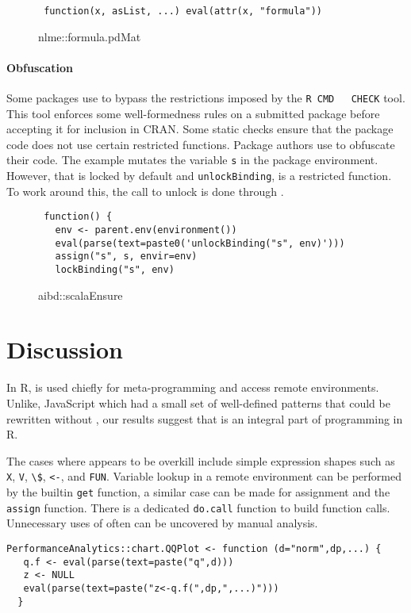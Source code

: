 \documentclass[screen,acmsmall]{acmart}%
\renewcommand{\k}[1]{\lstinline |#1|\xspace}
\begin{document}
\begin{figure}[h]
\begin{lstlisting}
 function(x, asList, ...) eval(attr(x, "formula"))
\end{lstlisting}
  \caption{nlme::formula.pdMat}
\end{figure}

\paragraph{Obfuscation}
Some packages use \eval to bypass the restrictions imposed by the \k{R CMD
  CHECK} tool. This tool enforces some well-formedness rules on a submitted
package before accepting it for inclusion in CRAN. Some static checks ensure
that the package code does not use certain restricted functions. Package authors
use \eval to obfuscate their code. The example mutates the variable \k{s} in
the package environment. However, that is locked by default and
\k{unlockBinding}, is a restricted function. To work around this, the call to
unlock is done through \eval.

\begin{figure}[h]
\begin{lstlisting}
 function() {
   env <- parent.env(environment())
   eval(parse(text=paste0('unlockBinding("s", env)')))
   assign("s", s, envir=env)
   lockBinding("s", env)
\end{lstlisting}
  \caption{aibd::scalaEnsure}
\end{figure}

\section{Discussion}


In R, \eval is used chiefly for meta-programming and access remote environments.
Unlike, JavaScript which had a small set of well-defined patterns that could be
rewritten without \eval, our results suggest that \eval is an integral part of
programming in R.

The cases where \eval appears to be overkill include simple expression shapes
such as \k{X}, \k{V}, \k{\$}, \k{<-}, and \k{FUN}. Variable lookup in a remote
environment can be performed by the builtin \k{get} function, a similar case
can be made for assignment and the \k{assign} function. There is a dedicated
\k{do.call} function to build function calls. Unnecessary uses of \eval
often can be uncovered by manual analysis.

\begin{lstlisting}
PerformanceAnalytics::chart.QQPlot <- function (d="norm",dp,...) {
   q.f <- eval(parse(text=paste("q",d)))
   z <- NULL
   eval(parse(text=paste("z<-q.f(",dp,",...)")))
  }
\end{lstlisting}
\end{document}
